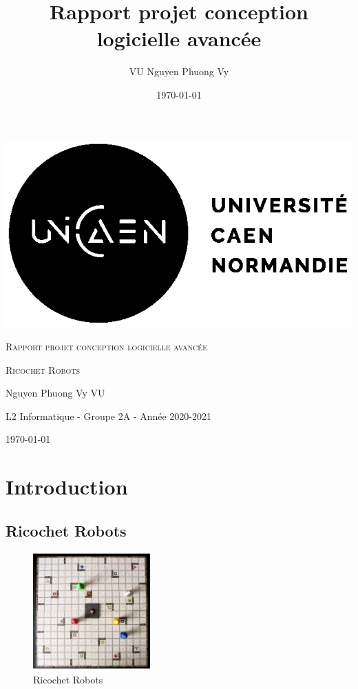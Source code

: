\documentclass[12pt, pdflatex]{article}
\title{Rapport projet conception logicielle avancée}
\author{VU Nguyen Phuong Vy}
\date{\today}
\begin{document}
\begin{titlepage}
    \centering
    \includegraphics{sources/logo-unicaen.png}\par\vspace{1cm}
    {\scshape\LARGE Rapport projet conception logicielle avancée \par}
    \vspace{1cm}
    {\scshape\LARGE Ricochet Robots\par}
    \vspace{1cm}
	{\large Nguyen Phuong Vy VU\par}
    \vspace{11cm}
    {\large L2 Informatique - Groupe 2A - Année 2020-2021\par}
	{\large \today \par}

\end{titlepage}

\pagebreak

\tableofcontents

\pagebreak
\section{Introduction}
    \subsection{Ricochet Robots}

    \begin{figure}
        \centering
        \includegraphics[width=0.4\textwidth, trim=0pt 0pt 0pt 30pt]{sources/rr-orig.jpg}
        \caption{Ricochet Robots}
        \vspace{-20pt}
    \end{figure}
\end{document}
